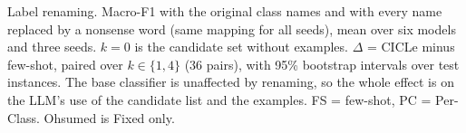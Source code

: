 \begin{table}[t]
  \centering
  \small
  \setlength{\tabcolsep}{4pt}
  \resizebox{\textwidth}{!}{}
  \caption{Label renaming. Macro-F1 with the original class names and with every name replaced by a nonsense word (same mapping for all seeds), mean over six models and three seeds. $k = 0$ is the candidate set without examples. $\Delta$ = CICLe minus few-shot, paired over $k \in \{1, 4\}$ (36 pairs), with 95\% bootstrap intervals over test instances. The base classifier is unaffected by renaming, so the whole effect is on the LLM's use of the candidate list and the examples. FS = few-shot, PC = Per-Class. Ohsumed is Fixed only.}
  \label{tab:relabel}
\end{table}
